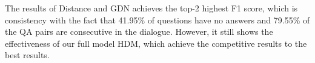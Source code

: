 The results of Distance and GDN achieves the top-2 highest F1 score, which is consistency with the fact that 41.95\% of questions have no answers and 79.55\% of the QA pairs are consecutive in the dialogue. However, it still shows the effectiveness of our full model HDM, which achieve the competitive results to the best results.



